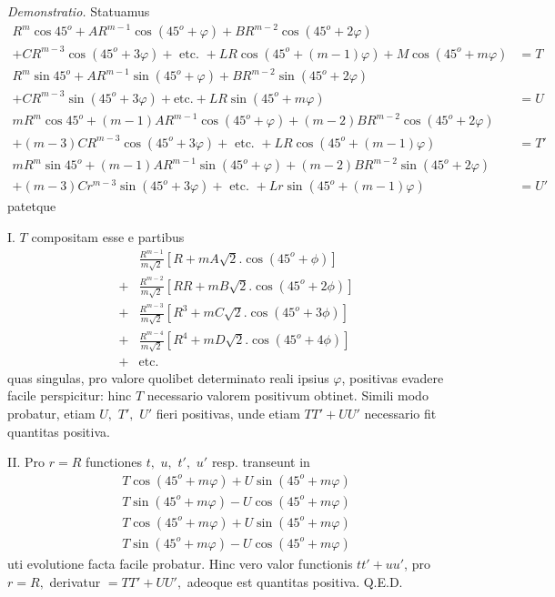 \documentclass[14pt]{memoir}
\theoremstyle{plain}
\theoremstyle{remark}
\begin{document}
\textit{Demonstratio.} Statuamus 
\[\begin{array}{rl}
R^m\cos 45^o + A R^{m-1}\cos(45^o+\varphi)+BR^{m-2}\cos(45^o+2\varphi) &\\ +CR^{m-3}\cos(45^o+3\varphi)+\text{ etc. }+LR\cos(45^o+(m-1)\varphi)+M\cos(45^o+m\varphi) &=T\\
R^m\sin45^o+AR^{m-1}\sin(45^o+\varphi)+BR^{m-2}\sin(45^o+2\varphi)&\\+CR^{m-3}\sin(45^o+3\varphi)+\text{etc.}+LR\sin(45^o+m\varphi)&=U \\
mR^m\cos 45^o +(m-1)AR^{m-1}\cos(45^o+\varphi)+(m-2)BR^{m-2}\cos(45^o+2\varphi)&\\+(m-3)CR^{m-3}\cos(45^o+3\varphi)+\text{ etc. }+LR\cos(45^o+(m-1)\varphi) &= T'\\
mR^m\sin45^o +(m-1)AR^{m-1}\sin(45^o+\varphi) + (m-2)BR^{m-2}\sin(45^o+2\varphi)&\\+(m-3)Cr^{m-3}\sin(45^o+3\varphi)+\text{ etc. }+Lr\sin(45^o+(m-1)\varphi) &= U'\end{array}\]
patetque 

I. \(T\) compositam esse e partibus \[\begin{array}{rl}
&\frac{R^{m-1}}{m\surd{2}} \left[R+mA\surd{2}.\cos(45^o+\phi)\right]\\
+&\frac{R^{m-2}}{m\surd{2}}\left[RR+mB\surd{2}.\cos(45^o+2\phi)\right]\\
+&\frac{R^{m-3}}{m\surd{2}}\left[R^3+mC\surd{2}.\cos(45^o+3\phi)\right]\\
+&\frac{R^{m-4}}{m\surd{2}}\left[R^4+mD\surd{2}.\cos(45^o+4\phi)\right]\\
+&\text{etc.} \end{array}\]
quas singulas, pro valore quolibet determinato reali ipsius \(\varphi\), positivas evadere facile perspicitur: hinc \(T\) necessario valorem positivum obtinet. Simili modo probatur, etiam \(U, \) \(T',\) \(U'\) fieri positivas, unde etiam \(TT'+UU'\) necessario 
fit quantitas positiva. 

II. Pro \(r=R\) functiones \(t,\) \(u,\) \(t',\) \(u'\) resp. transeunt in 
\[\begin{array}{c}
T\cos(45^o+m\varphi)+U\sin(45^o+m\varphi)\\
T\sin(45^o+m\varphi)-U\cos(45^o+m\varphi)\\
T\cos(45^o+m\varphi)+U\sin(45^o+m\varphi)\\
T\sin(45^o+m\varphi)-U\cos(45^o+m\varphi)\end{array}\]
uti evolutione facta facile probatur. Hinc vero valor functionis \(tt'+uu'\), pro \(r=R,\) derivatur \(=TT'+UU',\) adeoque est quantitas positiva. Q.E.D. 
\end{document}
